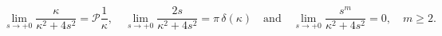 \begin{equation}
\lim_{s\to +0}\frac{\kappa}{\kappa^2+4s^2}=\mathscr{P}\frac{1}{\kappa},
\quad
\lim_{s\to +0}\frac{2s}{\kappa^2+4s^2}=\pi\,\delta(\kappa)
\quad\text{and}\quad
\lim_{s\to +0}\frac{s^m}{\kappa^2+4s^2}=0,\quad m\geqslant 2.
\label{limits}
\end{equation}

